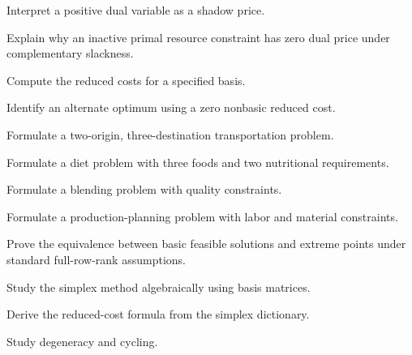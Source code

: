 \begin{exercise}[3]
Interpret a positive dual variable as a shadow price.
\end{exercise}

\begin{exercise}[3]
Explain why an inactive primal resource constraint has zero dual price
under complementary slackness.
\end{exercise}

\begin{exercise}[3]
Compute the reduced costs for a specified basis.
\end{exercise}

\begin{exercise}[3]
Identify an alternate optimum using a zero nonbasic reduced cost.
\end{exercise}

\begin{exercise}[3]
Formulate a two-origin, three-destination transportation problem.
\end{exercise}

\begin{exercise}[3]
Formulate a diet problem with three foods and two nutritional
requirements.
\end{exercise}

\begin{exercise}[3]
Formulate a blending problem with quality constraints.
\end{exercise}

\begin{exercise}[3]
Formulate a production-planning problem with labor and material
constraints.
\end{exercise}

\begin{exercise}[4]
Prove the equivalence between basic feasible solutions and extreme points
under standard full-row-rank assumptions.
\end{exercise}

\begin{exercise}[4]
Study the simplex method algebraically using basis matrices.
\end{exercise}

\begin{exercise}[4]
Derive the reduced-cost formula from the simplex dictionary.
\end{exercise}

\begin{exercise}[4]
Study degeneracy and cycling.
\end{exercise}

